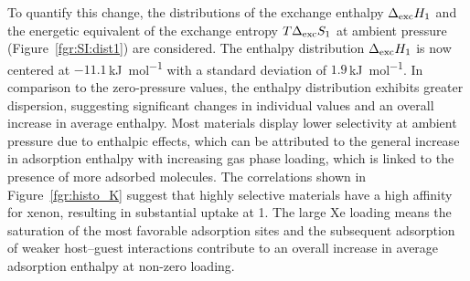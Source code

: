 \documentclass[main.tex]{subfiles}
\begin{document}
To quantify this change, the distributions of the exchange enthalpy $\Delta_{\text{exc}}H_{\text{1}}$ and the energetic equivalent of the exchange entropy $T\Delta_{\text{exc}}S_{\text{1}}$ at ambient pressure (Figure~\ref{fgr:SI:dist1}) are considered. The enthalpy distribution $\Delta_{\text{exc}}H_{\text{1}}$ is now centered at $-11.1$\,\si{\kilo\joule\per\mol} with a standard deviation of $1.9$\,\si{\kilo\joule\per\mol}. In comparison to the zero-pressure values, the enthalpy distribution exhibits greater dispersion, suggesting significant changes in individual values and an overall increase in average enthalpy. Most materials display lower selectivity at ambient pressure due to enthalpic effects, which can be attributed to the general increase in adsorption enthalpy with increasing gas phase loading, which is linked to the presence of more adsorbed molecules. The correlations shown in Figure~\ref{fgr:histo_K} suggest that highly selective materials have a high affinity for xenon, resulting in substantial uptake at \SI{1}{\atm}. The large Xe loading means the saturation of the most favorable adsorption sites and the subsequent adsorption of weaker host--guest interactions contribute to an overall increase in average adsorption enthalpy at non-zero loading.
\end{document}
